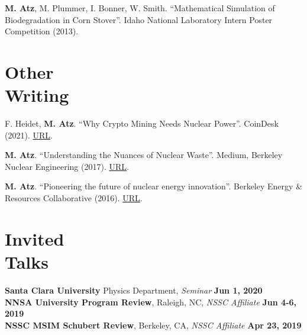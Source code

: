 \documentclass[margin,line]{resume}
\begin{document}
\begin{resume}
\begin{bibenum}
    \item \textbf{M. Atz}, M. Plummer, I. Bonner, W. Smith. ``Mathematical Simulation of Biodegradation in Corn Stover''. Idaho National Laboratory Intern Poster Competition (2013).

\end{bibenum}
\section{\mysidestyle Other\\Writing}
\begin{bibenum}

    \item F. Heidet, \textbf{M. Atz}. ``Why Crypto Mining Needs Nuclear Power''. CoinDesk (2021). \href{https://www.coindesk.com/policy/2021/10/13/why-crypto-mining-needs-nuclear-power/}{URL}.
    
    \item \textbf{M. Atz}. ``Understanding the Nuances of Nuclear Waste''. Medium, Berkeley Nuclear Engineering (2017). \href{https://medium.com/berkeley-nuclear-engineering/understanding-the-nuances-of-nuclear-waste-5c123ba4211f}{URL}.
    
    \item \textbf{M. Atz}. ``Pioneering the future of nuclear energy innovation''. Berkeley Energy \& Resources Collaborative (2016). \href{http://berc.berkeley.edu/pioneering-future-nuclear-energy-innovation/}{URL}.
\end{bibenum}

\vspace{8mm}
\section{\mysidestyle Invited\\Talks}
\textbf{Santa Clara University} Physics Department, \textsl{Seminar} \hfill \textbf{Jun 1, 2020}\\
\textbf{NNSA University Program Review}, Raleigh, NC, \textsl{NSSC Affiliate} \hfill \textbf{Jun 4-6, 2019}\\
\textbf{NSSC MSIM Schubert Review}, Berkeley, CA, \textsl{NSSC Affiliate} \hfill \textbf{Apr 23, 2019}\\


\end{resume}
\end{document}
